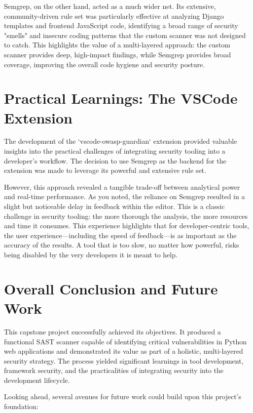Semgrep, on the other hand, acted as a much wider net. Its extensive, community-driven rule set was particularly effective at analyzing Django templates and frontend JavaScript code, identifying a broad range of security "smells" and insecure coding patterns that the custom scanner was not designed to catch. This highlights the value of a multi-layered approach: the custom scanner provides deep, high-impact findings, while Semgrep provides broad coverage, improving the overall code hygiene and security posture.

\section{Practical Learnings: The VSCode Extension}

The development of the `vscode-owasp-guardian` extension provided valuable insights into the practical challenges of integrating security tooling into a developer's workflow. The decision to use Semgrep as the backend for the extension was made to leverage its powerful and extensive rule set.

However, this approach revealed a tangible trade-off between analytical power and real-time performance. As you noted, the reliance on Semgrep resulted in a slight but noticeable delay in feedback within the editor. This is a classic challenge in security tooling: the more thorough the analysis, the more resources and time it consumes. This experience highlights that for developer-centric tools, the user experience—including the speed of feedback—is as important as the accuracy of the results. A tool that is too slow, no matter how powerful, risks being disabled by the very developers it is meant to help.

\section{Overall Conclusion and Future Work}

This capstone project successfully achieved its objectives. It produced a functional SAST scanner capable of identifying critical vulnerabilities in Python web applications and demonstrated its value as part of a holistic, multi-layered security strategy. The process yielded significant learnings in tool development, framework security, and the practicalities of integrating security into the development lifecycle.

Looking ahead, several avenues for future work could build upon this project's foundation:

